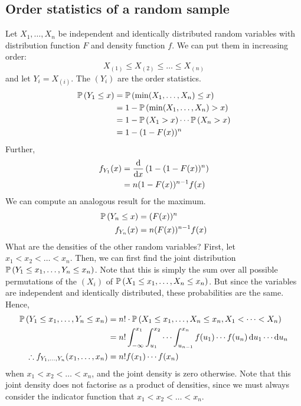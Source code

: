 \subsection{Order statistics of a random sample}
Let \(X_1, \dots, X_n\) be independent and identically distributed random variables with distribution function \(F\) and density function \(f\).
We can put them in increasing order:
\[
	X_{(1)} \leq X_{(2)} \leq \dots \leq X_{(n)}
\]
and let \(Y_i = X_{(i)}\).
The \((Y_i)\) are the order statistics.
\begin{align*}
	\mathbb{P}\left({Y_1 \leq x}\right) & = \mathbb{P}\left({\min(X_1, \dots, X_n) \leq x}\right)    \\
	                  & = 1 - \mathbb{P}\left({\min(X_1, \dots, X_n) > x}\right)   \\
	                  & = 1 - \mathbb{P}\left({X_1 > x}\right)\cdots\mathbb{P}\left({X_n > x}\right) \\
	                  & = 1 - (1 - F(x))^n
\end{align*}
Further,
\begin{align*}
	f_{Y_1}(x) & = \dv{x}\left( 1 - (1 - F(x))^n \right) \\
	           & = n (1 - F(x))^{n-1} f(x)
\end{align*}
We can compute an analogous result for the maximum.
\begin{align*}
	\mathbb{P}\left({Y_n \leq x}\right) & = (F(x))^n           \\
	f_{Y_n}(x)        & = n(F(x))^{n-1} f(x)
\end{align*}
What are the densities of the other random variables?
First, let \(x_1 < x_2 < \dots < x_n\).
Then, we can first find the joint distribution \(\mathbb{P}\left({Y_1 \leq x_1, \dots, Y_n \leq x_n}\right)\).
Note that this is simply the sum over all possible permutations of the \((X_i)\) of \(\mathbb{P}\left({X_1 \leq x_1, \dots, X_n \leq x_n}\right)\).
But since the variables are independent and identically distributed, these probabilities are the same.
Hence,
\begin{align*}
	\mathbb{P}\left({Y_1 \leq x_1, \dots, Y_n \leq x_n}\right)        & = n!
	\cdot \mathbb{P}\left({X_1 \leq x_1, \dots, X_n \leq x_n, X_1 < \dots < X_n}\right)                                               \\
	                                                & = n!
	\int_{-\infty}^{x_1} \int_{u_1}^{x_2} \cdots \int_{u_{n-1}}^{x_n} f(u_1) \cdots f(u_n) \dd{u_1} \cdots \dd{u_n} \\
	\therefore f_{Y_1, \dots, Y_n}(x_1, \dots, x_n) & = n!
	f(x_1) \cdots f(x_n)
\end{align*}
when \(x_1 < x_2 < \dots < x_n\), and the joint density is zero otherwise.
Note that this joint density does not factorise as a product of densities, since we must always consider the indicator function that \(x_1 < x_2 < \dots < x_n\).

